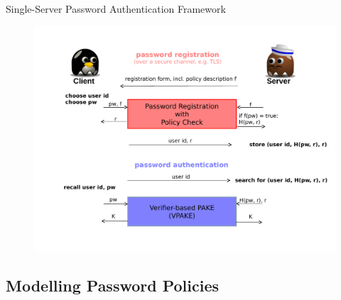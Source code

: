 \documentclass[notes,xcolor=dvipsnames]{beamer}
\begin{document}
\newsavebox{\savelisting}
\newenvironment{listing}
{\vspace*{-2em}\begin{lrbox}{\savelisting}
\begin{minipage}{4.8in}
\begin{flushleft}}
{\end{flushleft}
\end{minipage}
\end{lrbox}
\begin{center}
\resizebox{\columnwidth}{!}{\setlength\fboxsep{6pt}\fbox{\usebox{\savelisting}}}
\end{center}}

\begin{frame}{Single-Server Password Authentication Framework}
  \begin{figure}
  \centering
  \includegraphics[width=\textwidth]{framework1.pdf}
  \end{figure}
\end{frame}

\subsection{Modelling Password Policies}
\end{document}
